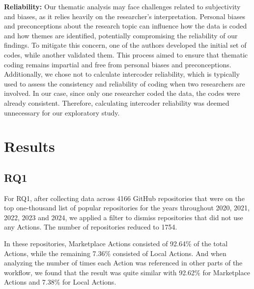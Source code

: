 \documentclass[conference]{IEEEtran}
\begin{document}
	\textbf{Reliability:}  Our thematic analysis may face challenges related to subjectivity and biases, as it relies heavily on the researcher's interpretation. Personal biases and preconceptions about the research topic can influence how the data is coded and how themes are identified, potentially compromising the reliability of our findings. To mitigate this concern, one of the authors developed the initial set of codes, while another validated them. This process aimed to ensure that thematic coding remains impartial and free from personal biases and preconceptions. Additionally, we chose not to calculate intercoder reliability, which is typically used to assess the consistency and reliability of coding when two researchers are involved. In our case, since only one researcher coded the data, the codes were already consistent. Therefore, calculating intercoder reliability was deemed unnecessary for our exploratory study.


\section{Results}

  \subsection{RQ1}
      For RQ1, after collecting data across 4166 GitHub repositories that were on the top one-thousand list of popular repositories for the years throughout 2020, 2021, 2022, 2023 and 2024, we applied a filter to dismiss repositories that did not use any Actions. The number of repositories reduced to 1754. 

      In these repositories, Marketplace Actions consisted of 92.64\% of the total Actions, while the remaining 7.36\% consisted of Local Actions. And when analyzing the number of times each Action was referenced in other parts of the workflow, we found that the result was quite similar with 92.62\% for Marketplace Actions and 7.38\% for Local Actions.
\end{document}
